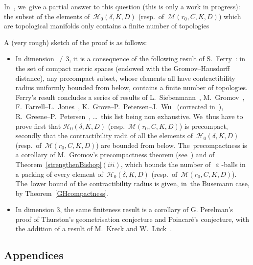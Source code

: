\documentclass[10pt,a4paper]{amsart}
\providecommand{\cal}{\mathcal}
\numberwithin{equation}{section}
\newcommand{\e}{\operatorname{\varepsilon}}
\begin{document}
In~\cite{BCGS2}, we~give a partial answer to this question (this is only a work in progress):
the subset of the elements of~${\cal H}_0 (\delta, K, D)$
(resp.\ of~${\cal M} (r_0, C, K, D)$) which are topological manifolds only contains a finite number of topologies

A (very rough) sketch of the proof is as follows:
\begin{itemize}\itemsep=0pt
\item
In dimension $\ne 3$, it is a consequence of the following result of S.~Ferry~\cite[Theorem~1]{Fe}: in the set of compact metric spaces
(endowed with the Gromov--Hausdorff distance), any precompact subset, whose elements all have contractibility radius uniformly bounded from below, contains a finite number of topologies. Ferry's result concludes a series
of results of L.~Siebenmann~\cite{Sie}, M.~Gromov~\cite{Gro-Large}, F.~Farrell--L.~Jones~\cite{FJ}, K.~Grove--P.~Petersen--J.~Wu~\cite{GPW} (corrected in~\cite{GrPW}), R.~Greene--P.~Petersen~\cite{GPe}, \dots\ this list being
non exhaustive. We~thus have to prove first that
${\cal H}_0 (\delta, K, D)$ (resp.\ ${\cal M} (r_0, C, K, D)$) is precompact, secondly that the contractibility radii of all the elements of~${\cal H}_0 (\delta, K, D)$ (resp.\ of~${\cal M} (r_0, C, K, D)$) are bounded from below. The~precompactness is a corollary of
M.~Gromov's precompactness theorem (see~\cite[Proposition~5.2]{Gr1}) and of Theorem~\ref{strengthenBishop}$(iii)$, which bounds the number of~$\e$-balls
in a packing of every element of~${\cal H}_0 (\delta, K, D)$ (resp.\ of~${\cal M} (r_0, C, K, D)$). The~lower bound of the contractibility radius is given, in~the Busemann case, by Theorem~\ref{GHcompactness}.

\item In dimension 3, the same finiteness result is a corollary of G. Perelman's proof of Thurston's geometrisation conjecture and Poincar\'e's conjecture, with the addition of a result of M.~Kreck and W.~L\"uck~\cite[Theorem~0.7]{KL}.
\end{itemize}

\subsection{Appendices}
\end{document}
